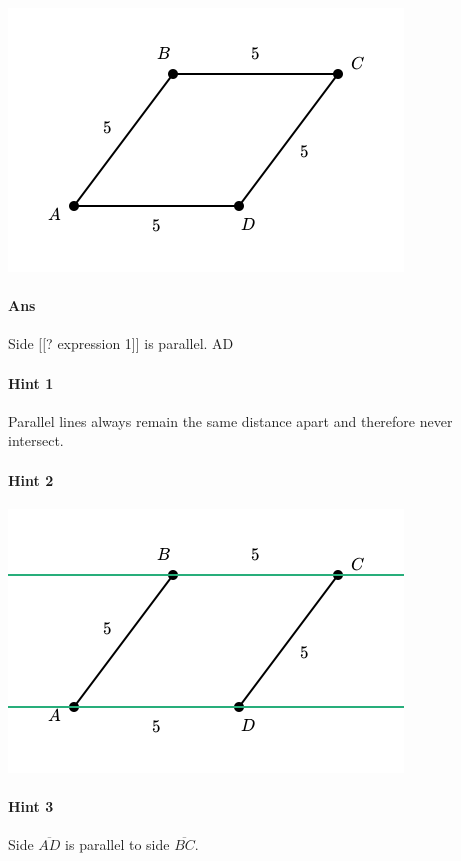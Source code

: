 \documentclass[twocolumn,10pt]{article}
\def\shrinkfactor{0.55}
\begin{document}
\includegraphics[scale=\shrinkfactor]{figures/84f3fcb82754c1a5d2b6c841c69a1a562675f88b.png}

\paragraph{Ans} Side [[? expression 1]] is parallel.
  AD

\paragraph{Hint 1}Parallel lines always remain the same distance apart and therefore never intersect. 

\paragraph{Hint 2}
\includegraphics[scale=\shrinkfactor]{figures/677e2bdf627d0186c2d7eb494916d32d1ab4f1d0.png}

\paragraph{Hint 3}Side $\overline{AD}$ is parallel to side $\overline{BC}$.
\end{document}
